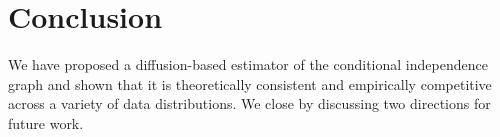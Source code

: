 \documentclass[11pt,a4paper,final]{article}
\numberwithin{equation}{section}
\theoremstyle{remark}
\begin{document}


\section{Conclusion} \label{sec:conclusion}

We have proposed a diffusion-based estimator of the conditional independence graph and shown that it is theoretically consistent and empirically competitive across a variety of data distributions.
We close by discussing two directions for future work.
\end{document}
